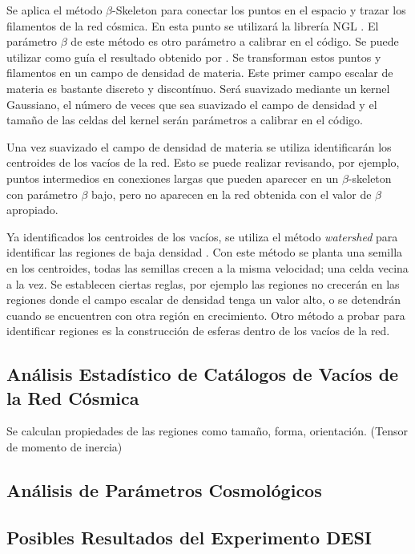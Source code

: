\documentclass[preprint]{aastex62}
\begin{document}
  Se aplica el método $\beta$-Skeleton para conectar los puntos en el espacio y trazar los
  filamentos de la red cósmica. En esta punto se utilizará la librería NGL \citep{ngl}.
  El parámetro $\beta$ de este método es otro parámetro a calibrar en el código. Se puede
  utilizar como guía el resultado obtenido por \citet{Fang2018}.
  Se transforman estos puntos y filamentos en un campo de densidad de materia. Este primer
  campo escalar de materia es bastante discreto y discontínuo. Será suavizado mediante un
  kernel Gaussiano, el número de veces que sea suavizado el campo de densidad y el tamaño de
  las celdas del kernel serán parámetros a calibrar en el código.

  Una vez suavizado el campo de densidad de materia se utiliza identificarán los centroides
  de los vacíos de la red. Esto se puede realizar revisando, por ejemplo, puntos intermedios
  en conexiones largas  que pueden aparecer en un $\beta$-skeleton con parámetro $\beta$ bajo,
  pero no aparecen en la red obtenida con el valor de $\beta$ apropiado.

  Ya identificados los centroides de los vacíos, se utiliza el método \textit{watershed}
  para identificar las regiones de baja densidad \citep{Sutter2015}. Con este método
  se planta una semilla en los centroides, todas las semillas crecen a la misma velocidad; una
  celda vecina a la vez. Se establecen ciertas reglas, por ejemplo las regiones no crecerán en
  las regiones donde el campo escalar de densidad tenga un valor alto, o se detendrán cuando
  se encuentren con otra región en crecimiento. Otro método a probar para identificar regiones
  es la construcción de esferas dentro de los vacíos de la red. 

  \subsection{Análisis Estadístico de Catálogos de Vacíos de la Red Cósmica}

  Se calculan propiedades de las regiones como tamaño, forma, orientación. (Tensor de momento de inercia) \citep{El-Ad1997}

  \subsection{Análisis de Parámetros Cosmológicos}

  \subsection{Posibles Resultados del Experimento DESI}
  
\end{document}
